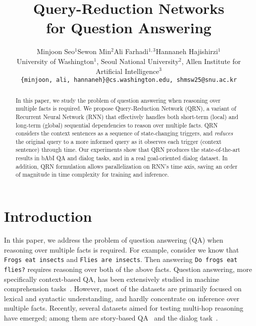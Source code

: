 \documentclass[table]{article}
\title{Query-Reduction Networks\\
for Question Answering}
\author{
  Minjoon Seo$^1$\qquad Sewon Min$^2$\qquad Ali Farhadi$^{1,3}$\qquad Hannaneh Hajishirzi$^1$ \\
  University of Washington$^1$, Seoul National University$^2$, Allen Institute for Artificial Intelligence$^3$ \\
  \texttt{\{minjoon, ali, hannaneh\}@cs.washington.edu, shmsw25@snu.ac.kr}
}
\begin{document}
\maketitle

\begin{abstract}





In this paper, we study the problem of question answering when reasoning over multiple facts is required. 
We propose Query-Reduction Network (QRN), a variant of Recurrent Neural Network (RNN) that effectively handles both short-term (local) and long-term (global) sequential dependencies to reason over multiple facts. 
QRN considers the context sentences as a sequence of state-changing triggers, and \emph{reduces} the
original query to a more informed query as it observes each trigger (context sentence) through time. 
Our experiments show that QRN produces the state-of-the-art results in  bAbI QA and dialog tasks, and in a real goal-oriented dialog dataset. In addition, QRN formulation allows parallelization on RNN's time axis, saving an order of magnitude in time complexity for training and inference.  

\end{abstract}

\section{Introduction}\label{sec:intro}


In this paper, we address the problem of  question answering (QA) when reasoning over multiple facts is required. 
For example, consider we know that \texttt{Frogs eat insects} and \texttt{Flies are insects}. 
Then answering \texttt{Do frogs eat flies?} requires reasoning over both of the above facts. Question answering, more specifically context-based QA, has been extensively studied in machine comprehension tasks~\citep{MCTest,hermann2015teaching,hill2015goldilocks,squad}. However, most of the datasets are primarily focused on lexical and syntactic understanding, and hardly concentrate on inference over multiple facts. 
Recently, several datasets aimed for testing multi-hop reasoning have emerged; among them are story-based QA~\citep{babi} and the dialog task~\citep{bordes2016learning}.
\end{document}

